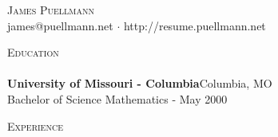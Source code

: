 \documentclass[a4paper]{article}
\newcommand{\lineunder} {
    \vspace*{-8pt} \\
    \hspace*{-18pt} \hrulefill \\
}
\newcommand{\header} [1] {
    {\hspace*{-18pt}\vspace*{6pt} \textsc{#1}}
    \vspace*{-6pt} \lineunder
}
\begin{document}
\vspace*{-40pt}

    

\vspace*{-10pt}
\begin{center}
	{\Huge \scshape {James Puellmann}}\\
	james@puellmann.net $\cdot$ http://resume.puellmann.net\\
\end{center}

\header{Education}
\textbf{University of Missouri - Columbia}\hfill Columbia, MO\\
Bachelor of Science Mathematics \hfill  - May 2000\\
\vspace{2mm}

\header{Experience}
\vspace{1mm}
\end{document}
